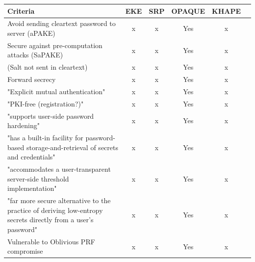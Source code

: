 \documentclass[../report.tex]{subfiles}
\begin{document}
\begin{center}
   \begin{tabular}{ | p{8cm} || c | c | c | c | c | }
     \hline
     \textbf{Criteria} & \textbf{EKE} & \textbf{SRP} & \textbf{OPAQUE} & \textbf{KHAPE} \\ \hline
     
     
     
     Avoid sending cleartext password to server (aPAKE) & x & x & Yes & x \\ \hline
     Secure against pre-computation attacks (SaPAKE) & x & x & Yes & x \\ \hline
     (Salt not sent in cleartext) & x & x & Yes & x \\ \hline
     Forward secrecy & x & x & Yes & x \\ \hline
     "Explicit mutual authentication" & x & x & Yes & x \\ \hline
     "PKI-free (registration?)" & x & x & Yes & x \\ \hline
     "supports user-side password hardening" & x & x & Yes & x \\ \hline
     "has a built-in facility for password-based storage-and-retrieval of secrets and credentials" & x & x & Yes & x \\ \hline
     "accommodates a user-transparent server-side threshold implementation" & x & x & Yes & x \\ \hline
     "far more secure alternative to the practice of deriving low-entropy secrets directly from a user's password" & x & x & Yes & x \\ \hline
     
     Vulnerable to Oblivious PRF compromise & x & x & Yes & x \\ \hline
     
     

     \end{tabular}
 \end{center}
\end{document}
